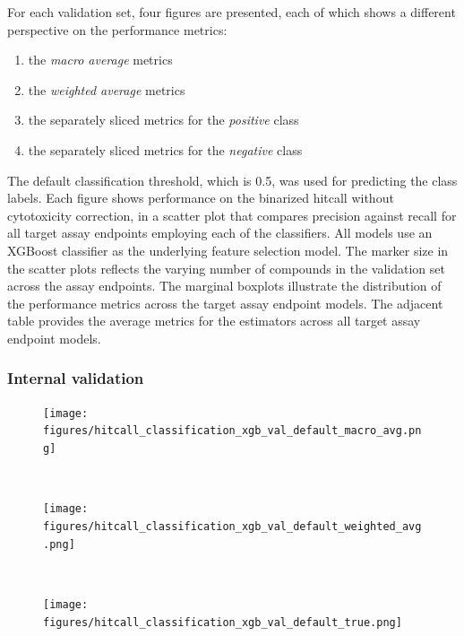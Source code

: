 For each validation set, four figures are presented, each of which shows a different perspective on the performance metrics:

\begin{enumerate}
  \item the \emph{macro average} metrics
  \item the \emph{weighted average} metrics
  \item the separately sliced metrics for the \emph{positive} class
  \item the separately sliced metrics for the \emph{negative} class
\end{enumerate}

The default classification threshold, which is 0.5, was used for predicting the class labels. Each figure shows performance on the binarized hitcall without cytotoxicity correction, in a scatter plot that compares precision against recall for all target assay endpoints employing each of the classifiers. All models use an XGBoost classifier as the underlying feature selection model. The marker size in the scatter plots reflects the varying number of compounds in the validation set across the assay endpoints. The marginal boxplots illustrate the distribution of the performance metrics across the target assay endpoint models. The adjacent table provides the average metrics for the estimators across all target assay endpoint models.


\subsubsection{Internal validation}
\begin{figure}[h]
  \centering
  \texttt{[image: figures/hitcall\_classification\_xgb\_val\_default\_macro\_avg.png]}
  \caption{}
~\label{fig:hitcall_classification_xgb_val_default_macro_avg}
\end{figure}

\begin{figure}[h]
  \centering
  \texttt{[image: figures/hitcall\_classification\_xgb\_val\_default\_weighted\_avg.png]}
  \caption{}
~\label{fig:hitcall_classification_xgb_val_default_weighted_avg}
\end{figure}

\begin{figure}[h]
  \centering
  \texttt{[image: figures/hitcall\_classification\_xgb\_val\_default\_true.png]}
  \caption{}
~\label{fig:hitcall_classification_xgb_val_default_true}
\end{figure}

